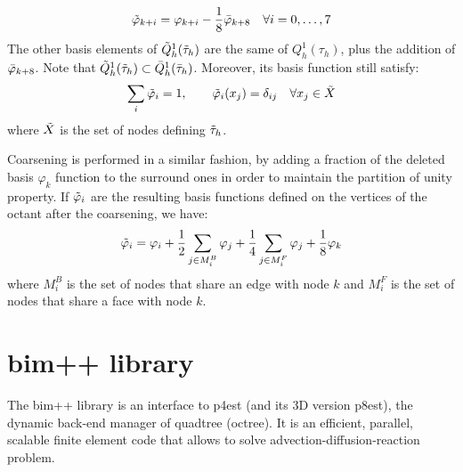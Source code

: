 \documentclass{Configuration_Files/PoliMi3i_thesis}
\let\phi\varphi
\begin{document}
\begin{equation}
    \Tilde{\phi}_{k+i}=\phi_{k+i}-\frac{1}{8}\Bar{\phi}_{k+8}\quad\forall i=0,\dots,7
    \label{eq: refinement}
\end{equation}
The other basis elements of $\Tilde{Q}^1_h(\Tilde{\tau}_h)$ are the same of $Q^1_h(\tau_h)$, plus the addition of $\Bar{\phi}_{k+8}$. Note that $\Tilde{Q}^1_h(\Tilde{\tau}_h)\subset\Bar{Q}^1_h(\Bar{\tau}_h)$. Moreover, its basis function still satisfy:
\begin{equation}
    \sum_i \Tilde{\phi}_{i}=1,\qquad \Tilde{\phi}_{i}(x_j)=\delta_{ij}\quad \forall x_j\in \Tilde{X} 
    \label{eq: refinement 2}
\end{equation}
where $\Tilde{X}$ is the set of nodes defining $\Tilde{\tau}_h$.

Coarsening is performed in a similar fashion, by adding a fraction of the deleted basis $\phi_k$ function to the surround ones in order to maintain the partition of unity property. If $\Tilde{\phi}_i$ are the resulting basis functions defined on the vertices of the octant after the coarsening, we have:
\begin{equation}
    \Tilde{\phi}_{i}=\phi_{i}+\frac{1}{2}\sum_{j\in M_i^B}\phi_j+\frac{1}{4}\sum_{j\in M_i^F}\phi_j+\frac{1}{8}\phi_k
    \label{eq: coarsening}
\end{equation}
where $M_i^B$ is the set of nodes that share an edge with node $k$ and $M_i^F$ is the set of
nodes that share a face with node $k$.

\chapter{bim++ library}
The bim++ library is an interface to p4est (and its 3D version p8est), the dynamic back-end manager of quadtree (octree). It is an efficient, parallel, scalable finite element code that allows to solve advection-diffusion-reaction problem.
\end{document}
